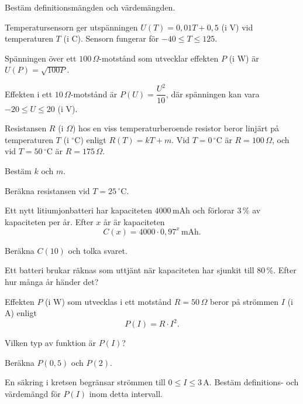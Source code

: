 Bestäm definitionsmängden och värdemängden.
\begin{parts}
  \item Temperatursensorn  ger utspänningen $U(T) = 0{,}01T + 0{,}5$ (i V) vid
    temperaturen $T$ (i \textdegree C). Sensorn fungerar för $-40 \leq T \leq 125$.
  \item Spänningen över ett $100\,\Omega$-motstånd som utvecklar effekten $P$ (i W) är $U(P) =
    \sqrt{100P}$.
  \item Effekten i ett $10\,\Omega$-motstånd är $P(U) = \dfrac{U^2}{10}$, där spänningen kan vara $-20
    \leq U \leq 20$ (i V).
\end{parts}

Resistansen $R$ (i $\Omega$) hos en viss temperaturberoende resistor beror linjärt på temperaturen
$T$ (i $^{\circ}$C) enligt $R(T) = kT + m$. Vid $T = 0\,^{\circ}\text{C}$ är $R = 100\,\Omega$, och
vid $T = 50\,^{\circ}\text{C}$ är $R = 175\,\Omega$.
\begin{parts}
  \item Bestäm $k$ och $m$.
  \item Beräkna resistansen vid $T = 25\,^{\circ}\text{C}$.
\end{parts}

Ett nytt litiumjonbatteri har kapaciteten $4000\,\text{mAh}$ och förlorar $3\,\%$ av kapaciteten
per år. Efter $x$ år är kapaciteten
\[
  C(x) = 4000 \cdot 0{,}97^x\,\text{mAh}.
\]
\begin{parts}
  \item Beräkna $C(10)$ och tolka svaret.
  \item Ett batteri brukar räknas som uttjänt när kapaciteten har sjunkit till $80\,\%$. Efter hur
    många år händer det?
\end{parts}

Effekten $P$ (i W) som utvecklas i ett motstånd $R = 50\,\Omega$ beror på strömmen $I$ (i A)
enligt
\[
  P(I) = R \cdot I^2.
\]
\begin{parts}
  \item Vilken typ av funktion är $P(I)$?
  \item Beräkna $P(0{,}5)$ och $P(2)$.
  \item En säkring i kretsen begränsar strömmen till $0 \leq I \leq 3\,\text{A}$. Bestäm
    definitions- och värdemängd för $P(I)$ inom detta intervall.
\end{parts}

